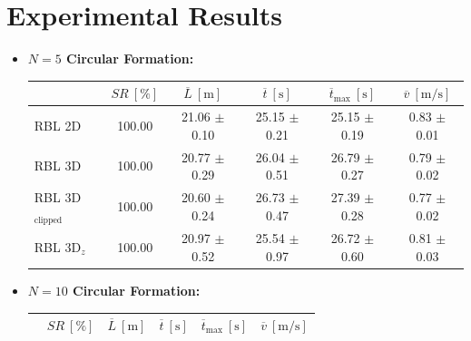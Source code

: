 \chapter{Experimental Results}
    \label{chap:exp_sim_res}
    \begin{itemize}
        \item \textbf{$N = 5$ Circular Formation:}
            \begin{table}[H]
                \centering
                \renewcommand{\arraystretch}{1.2}
                \begin{tabular}{|l|c|c|c|c|c|}
                \hline
                                            & \( SR \ [\%] \) & \( \overline{L} \ [\mathrm{m}] \) & \( \overline{t} \ [\mathrm{s}] \) & \( \overline{t}_{\text{max}} \ [\mathrm{s}] \) & \( \overline{v} \ [\mathrm{m/s}] \)     \\ \hline
                RBL \ac{2D}                      & 100.00          & 21.06 $\pm$ 0.10                  & 25.15 $\pm$ 0.21                  & 25.15 $\pm$ 0.19                               & 0.83 $\pm$ 0.01                         \\ \hline
                RBL \ac{3D}                      & 100.00          & 20.77 $\pm$ 0.29                  & 26.04 $\pm$ 0.51                  & 26.79 $\pm$ 0.27                               & 0.79 $\pm$ 0.02                         \\ \hline
                RBL \ac{3D}\(_{\text{clipped}}\) & 100.00          & 20.60 $\pm$ 0.24                  & 26.73 $\pm$ 0.47                  & 27.39 $\pm$ 0.28                               & 0.77 $\pm$ 0.02                         \\ \hline
                RBL \ac{3D}\(_z\)                & 100.00          & 20.97 $\pm$ 0.52                  & 25.54 $\pm$ 0.97                  & 26.72 $\pm$ 0.60                               & 0.81 $\pm$ 0.03                         \\ \hline
                \end{tabular}
            \end{table}
        \item \textbf{$N = 10$ Circular Formation:}
            \begin{table}[H]
                \centering
                \renewcommand{\arraystretch}{1.2}
                \begin{tabular}{|l|c|c|c|c|c|}
                \hline
                                            & \( SR \ [\%] \) & \( \overline{L} \ [\mathrm{m}] \) & \( \overline{t} \ [\mathrm{s}] \) & \( \overline{t}_{\text{max}} \ [\mathrm{s}] \) & \( \overline{v} \ [\mathrm{m/s}] \)     \\ \hline

\end{tabular}
\end{table}
\end{itemize}
